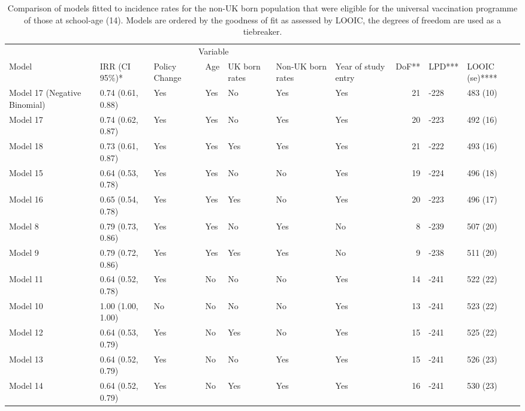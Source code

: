\documentclass[11pt,twoside]{bristolthesis}
\begin{document}
  \begin{landscape}\begin{table}[!h]
  
  \caption[Comparison of models fitted to incidence rates for the non-UK born population that were eligible for the universal vaccination programme of those at school-age (14).]{\label{tab:07-summary-universal-nonukborn}Comparison of models fitted to incidence rates for the non-UK born population that were eligible for the universal vaccination programme of those at school-age (14). Models are ordered by the goodness of fit as assessed by LOOIC, the degrees of freedom are used as a tiebreaker.}
  \centering
  \fontsize{8}{10}\selectfont
  \begin{tabular}{>{\raggedright\arraybackslash}p{3cm}llllllrll}
  \toprule
  \multicolumn{2}{c}{ } & \multicolumn{5}{c}{Variable} & \multicolumn{3}{c}{ } \\
  \cmidrule(l{3pt}r{3pt}){3-7}
  Model & IRR (CI 95\%)* & Policy Change & Age & UK born rates & Non-UK born rates & Year of study entry & DoF** & LPD*** & LOOIC (se)****\\
  \midrule
  Model 17 (Negative Binomial) & 0.74 (0.61, 0.88) & Yes & Yes & No & Yes & Yes & 21 & -228 & 483 (10)\\
  Model 17 & 0.74 (0.62, 0.87) & Yes & Yes & No & Yes & Yes & 20 & -223 & 492 (16)\\
  Model 18 & 0.73 (0.61, 0.87) & Yes & Yes & Yes & Yes & Yes & 21 & -222 & 493 (16)\\
  Model 15 & 0.64 (0.53, 0.78) & Yes & Yes & No & No & Yes & 19 & -224 & 496 (18)\\
  Model 16 & 0.65 (0.54, 0.78) & Yes & Yes & Yes & No & Yes & 20 & -223 & 496 (17)\\
  \addlinespace
  Model 8 & 0.79 (0.73, 0.86) & Yes & Yes & No & Yes & No & 8 & -239 & 507 (20)\\
  Model 9 & 0.79 (0.72, 0.86) & Yes & Yes & Yes & Yes & No & 9 & -238 & 511 (20)\\
  Model 11 & 0.64 (0.52, 0.78) & Yes & No & No & No & Yes & 14 & -241 & 522 (22)\\
  Model 10 & 1.00 (1.00, 1.00) & No & No & No & No & Yes & 13 & -241 & 523 (22)\\
  Model 12 & 0.64 (0.53, 0.79) & Yes & No & Yes & No & Yes & 15 & -241 & 525 (22)\\
  \addlinespace
  Model 13 & 0.64 (0.52, 0.79) & Yes & No & No & Yes & Yes & 15 & -241 & 526 (23)\\
  Model 14 & 0.64 (0.52, 0.79) & Yes & No & Yes & Yes & Yes & 16 & -241 & 530 (23)\\

\end{tabular}
\end{table}
\end{landscape}
\end{document}
